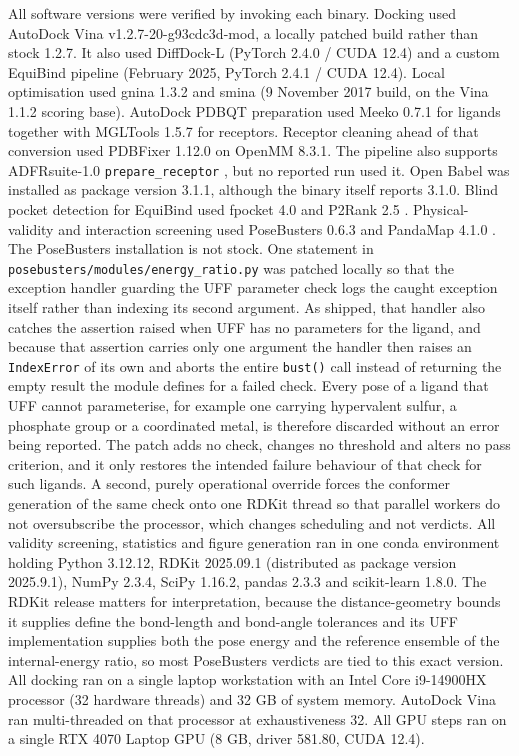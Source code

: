 All software versions were verified by invoking each binary. Docking used AutoDock Vina v1.2.7-20-g93cdc3d-mod, a locally patched build rather than stock 1.2.7. It also used DiffDock-L (PyTorch 2.4.0 / CUDA 12.4) and a custom EquiBind pipeline (February 2025, PyTorch 2.4.1 / CUDA 12.4). Local optimisation used gnina 1.3.2 and smina (9 November 2017 build, on the Vina 1.1.2 scoring base). AutoDock PDBQT preparation used Meeko 0.7.1 \cite{ref087} for ligands together with MGLTools 1.5.7 \cite{ref049} for receptors. Receptor cleaning ahead of that conversion used PDBFixer 1.12.0 on OpenMM 8.3.1. The pipeline also supports ADFRsuite-1.0 \texttt{prepare\_receptor} \cite{ref089}, but no reported run used it. Open Babel \cite{ref088} was installed as package version 3.1.1, although the binary itself reports 3.1.0. Blind pocket detection for EquiBind used fpocket 4.0 \cite{ref060} and P2Rank 2.5 \cite{ref061}. Physical-validity and interaction screening used PoseBusters 0.6.3 \cite{ref035} and PandaMap 4.1.0 \cite{ref090}. The PoseBusters installation is not stock. One statement in \texttt{posebusters/modules/energy\_ratio.py} was patched locally so that the exception handler guarding the UFF parameter check logs the caught exception itself rather than indexing its second argument. As shipped, that handler also catches the assertion raised when UFF has no parameters for the ligand, and because that assertion carries only one argument the handler then raises an \texttt{IndexError} of its own and aborts the entire \texttt{bust()} call instead of returning the empty result the module defines for a failed check. Every pose of a ligand that UFF cannot parameterise, for example one carrying hypervalent sulfur, a phosphate group or a coordinated metal, is therefore discarded without an error being reported. The patch adds no check, changes no threshold and alters no pass criterion, and it only restores the intended failure behaviour of that check for such ligands. A second, purely operational override forces the conformer generation of the same check onto one RDKit thread so that parallel workers do not oversubscribe the processor, which changes scheduling and not verdicts. All validity screening, statistics and figure generation ran in one conda environment holding Python 3.12.12, RDKit 2025.09.1 (distributed as package version 2025.9.1), NumPy 2.3.4, SciPy 1.16.2, pandas 2.3.3 and scikit-learn 1.8.0. The RDKit release matters for interpretation, because the distance-geometry bounds it supplies define the bond-length and bond-angle tolerances and its UFF implementation supplies both the pose energy and the reference ensemble of the internal-energy ratio, so most PoseBusters verdicts are tied to this exact version. All docking ran on a single laptop workstation with an Intel Core i9-14900HX processor (32 hardware threads) and 32 GB of system memory. AutoDock Vina ran multi-threaded on that processor at exhaustiveness 32. All GPU steps ran on a single RTX 4070 Laptop GPU (8 GB, driver 581.80, CUDA 12.4).

